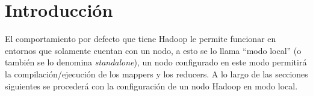 \section{Introducción}
\label{sec:introduccion}

El comportamiento por defecto que tiene Hadoop le permite funcionar en entornos
que solamente cuentan con un nodo, a esto se lo llama ``modo local'' (o también
se lo denomina {\it standalone}), un nodo configurado en este modo permitirá la
compilación/ejecución de los mappers y los reducers. A lo largo de las
secciones siguientes se procederá con la configuración de un nodo Hadoop en modo
local.

